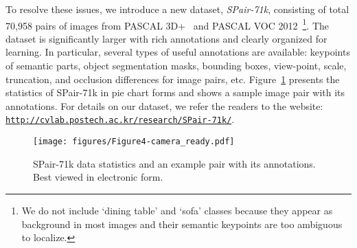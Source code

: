 \documentclass[10pt,twocolumn,letterpaper]{article}
\begin{document}
To resolve these issues, we introduce a new dataset, {\em SPair-71k}, consisting of total 70,958 pairs of images from PASCAL 3D+~\cite{Xiang2014BeyondPA} and PASCAL VOC 2012~\cite{everingham2015pascal}\footnote{We do not include `dining table' and `sofa' classes because they appear as background in most images and their semantic keypoints are too ambiguous to localize.}. The dataset is significantly larger with rich annotations and clearly organized for learning.   
In particular, several types of useful annotations are available: keypoints of semantic parts, object segmentation masks, bounding boxes, view-point, scale, truncation, and occlusion differences for image pairs, etc. Figure~\ref{fig:dataset_summary_example} presents the statistics of SPair-71k in pie chart forms and shows a sample image pair with its annotations. For details on our dataset, we refer the readers to the website: {\tt\small  \url{http://cvlab.postech.ac.kr/research/SPair-71k/}}. 
\vspace{-3mm}

\begin{figure}[t]
    \begin{center}
      \texttt{[image: figures/Figure4-camera\_ready.pdf]}
    \end{center}
    \vspace{-6mm}
    \caption{SPair-71k data statistics and an example pair with its annotations. Best viewed in electronic form.}
    \label{fig:dataset_summary_example}
    \vspace{-5mm}
\end{figure}
\end{document}
